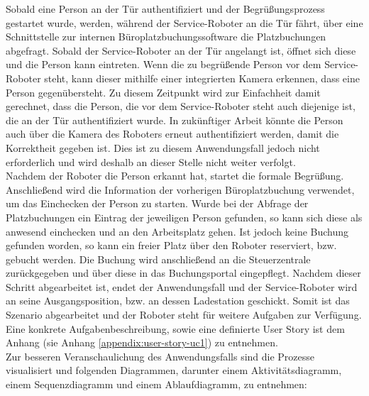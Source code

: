     Sobald eine Person an der Tür authentifiziert und der Begrüßungsprozess gestartet wurde, werden, während der Service-Roboter an 
    die Tür fährt, über eine Schnittstelle zur internen Büroplatzbuchungssoftware die Platzbuchungen abgefragt. 
    Sobald der Service-Roboter an der Tür angelangt ist, öffnet sich diese und die Person kann eintreten. Wenn die zu begrüßende 
    Person vor dem Service-Roboter steht, kann dieser mithilfe einer integrierten Kamera erkennen, dass eine Person gegenübersteht. 
    Zu diesem Zeitpunkt wird zur Einfachheit damit gerechnet, dass die Person, die vor dem Service-Roboter steht auch diejenige 
    ist, die an der Tür authentifiziert wurde. In zukünftiger Arbeit könnte die Person auch über die Kamera des Roboters erneut 
    authentifiziert werden, damit die Korrektheit gegeben ist. Dies ist zu diesem Anwendungsfall jedoch nicht erforderlich und 
    wird deshalb an dieser Stelle nicht weiter verfolgt.
    \\
    \linebreak
    Nachdem der Roboter die Person erkannt hat, startet die formale Begrüßung. Anschließend wird die Information der 
    vorherigen Büroplatzbuchung verwendet, um das Einchecken der Person zu starten. Wurde bei der Abfrage der Platzbuchungen ein 
    Eintrag der jeweiligen Person gefunden, so kann sich diese als anwesend einchecken und an den Arbeitsplatz gehen. Ist jedoch keine 
    Buchung gefunden worden, so kann ein freier Platz über den Roboter reserviert, bzw. gebucht werden. Die Buchung wird 
    anschließend an die Steuerzentrale zurückgegeben und über diese in das Buchungsportal eingepflegt. Nachdem dieser 
    Schritt abgearbeitet ist, endet der Anwendungsfall und der Service-Roboter wird an seine Ausgangsposition, bzw. an dessen 
    Ladestation geschickt. Somit ist das Szenario abgearbeitet und der Roboter steht für weitere Aufgaben zur Verfügung. 
    \\
    \linebreak
    Eine konkrete Aufgabenbeschreibung, sowie eine definierte User Story ist dem Anhang (sie Anhang \ref{appendix:user-story-uc1}) zu entnehmen. 
    \\
    Zur besseren Veranschaulichung des Anwendungsfalls sind die Prozesse visualisiert und folgenden Diagrammen, darunter 
    einem Aktivitätsdiagramm, einem Sequenzdiagramm und einem Ablaufdiagramm, zu entnehmen: 
    

